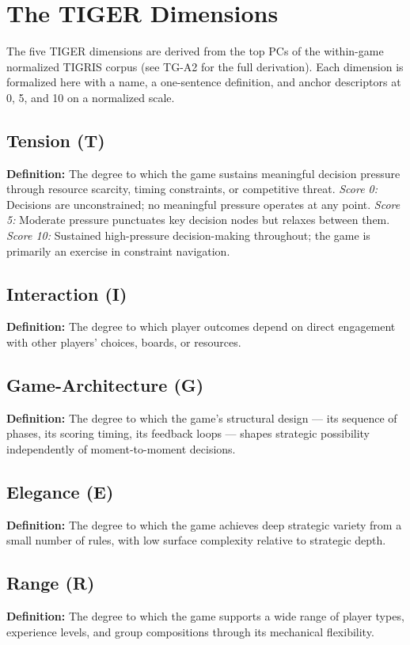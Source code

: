 \section{The TIGER Dimensions}
\label{sec:method}

The five TIGER dimensions are derived from the top PCs of the within-game normalized
TIGRIS corpus (see TG-A2 for the full derivation). Each dimension is formalized here
with a name, a one-sentence definition, and anchor descriptors at 0, 5, and 10 on
a normalized scale.

\subsection{Tension (T)}

\textbf{Definition:} The degree to which the game sustains meaningful decision pressure
through resource scarcity, timing constraints, or competitive threat.
\textit{Score 0:} Decisions are unconstrained; no meaningful pressure operates at any
point. \textit{Score 5:} Moderate pressure punctuates key decision nodes but relaxes
between them. \textit{Score 10:} Sustained high-pressure decision-making throughout;
the game is primarily an exercise in constraint navigation.

\subsection{Interaction (I)}

\textbf{Definition:} The degree to which player outcomes depend on direct engagement
with other players' choices, boards, or resources.

\subsection{Game-Architecture (G)}

\textbf{Definition:} The degree to which the game's structural design --- its sequence
of phases, its scoring timing, its feedback loops --- shapes strategic possibility
independently of moment-to-moment decisions.

\subsection{Elegance (E)}

\textbf{Definition:} The degree to which the game achieves deep strategic variety from
a small number of rules, with low surface complexity relative to strategic depth.

\subsection{Range (R)}

\textbf{Definition:} The degree to which the game supports a wide range of player types,
experience levels, and group compositions through its mechanical flexibility.
